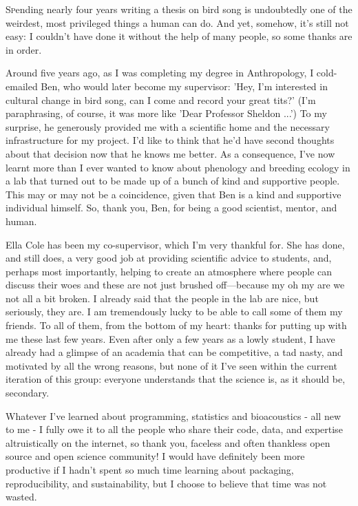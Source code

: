 \lettrine[lines=2,slope=0pt, nindent=5pt]Spending nearly four years writing a thesis on bird song is undoubtedly one of the weirdest, most privileged things a human can do. And yet, somehow, it's still not easy: I couldn't have done it without the help of many people, so some thanks are in order.

Around five years ago, as I was completing my degree in Anthropology, I cold-emailed Ben, who would later become my supervisor: 'Hey, I'm interested in cultural change in bird song, can I come and record your great tits?' (I'm paraphrasing, of course, it was more like 'Dear Professor Sheldon ...') To my surprise, he generously provided me with a scientific home and the necessary infrastructure for my project. I'd like to think that he'd have second thoughts about that decision now that he knows me better. As a consequence, I've now learnt more than I ever wanted to know about phenology and breeding ecology in a lab that turned out to be made up of a bunch of kind and supportive people. This may or may not be a coincidence, given that Ben is a kind and supportive individual himself. So, thank you, Ben, for being a good scientist, mentor, and human. 

Ella Cole has been my co-supervisor, which I'm very thankful for. She has done, and still does, a very good job at providing scientific advice to students, and, perhaps most importantly, helping to create an atmosphere where people can discuss their woes and these are not just brushed off---because my oh my are we not all a bit broken. I already said that the people in the lab are nice, but seriously, they are. I am tremendously lucky to be able to call some of them my friends. To all of them, from the bottom of my heart: thanks for putting up with me these last few years. Even after only a few years as a lowly student, I have already had a glimpse of an academia that can be competitive, a tad nasty, and motivated by all the wrong reasons, but none of it I've seen within the current iteration of this group: everyone understands that the science is, as it should be, secondary.

Whatever I've learned about programming, statistics and bioacoustics - all new to me - I fully owe it to all the people who share their code, data, and expertise altruistically on the internet, so thank you, faceless and often thankless open source and open science community! I would have definitely been more productive if I hadn't spent so much time learning about packaging, reproducibility, and sustainability, but I choose to believe that time was not wasted.

